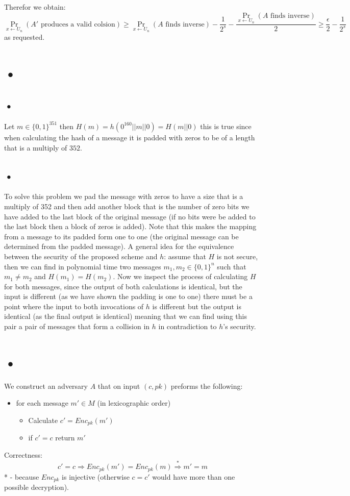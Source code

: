 \documentclass{article}
\begin{document}
Therefor we obtain:
\[\Pr_{x \leftarrow U_n}(A' \mbox{ produces a valid colsion}) \geq \Pr_{x \leftarrow U_n}(A \mbox{ finds inverse}) - \frac{1}{2^s} - \frac{\Pr_{x \leftarrow U_n}(A \mbox{ finds inverse})}{2} \geq \frac{\epsilon}{2} - \frac{1}{2^s}\]
as requested.

\section{•}
\subsection{•}
Let $m \in \{0,1\}^{351}$ then $H(m) = h(0^{160} || m || 0) = H(m||0)$ this is true since when calculating the hash of a message it is padded with zeros to be of a length that is a multiply of $352$.

\subsection{•}
To solve this problem we pad the message with zeros to have a size that is a multiply of 352 and then add another block that is the number of zero bits we have added to the last block of the original message (if no bits were be added to the last block then a block of zeros is added).
Note that this makes the mapping from a message to its padded form one to one (the original message can be determined from the padded message).
A general idea for the equivalence between the security of the proposed scheme and $h$:
assume that $H$ is not secure, then we can find in polynomial time two messages $m_1, m_2 \in \{0,1\}^n$ such that $m_1\neq m_2$ and $H(m_1) = H(m_2)$.
Now we inspect the process of calculating $H$ for both messages, since the output of both calculations is identical, but the input is different (as we have shown the padding is one to one) there must be a point where the input to both invocations of $h$ is different but the output is identical (as the final output is identical) meaning that we can find using this pair a pair of messages that form a collision in $h$ in contradiction to $h$'s security.

\section{•}
We construct an adversary $A$ that on input $(c, pk)$ preforms the following:
\begin{itemize}
\item for each message $m' \in M$ (in lexicographic order)
\begin{itemize}
\item Calculate $c'=Enc_{pk}(m')$
\item if $c'=c$ return $m'$
\end{itemize}
\end{itemize}
Correctness:
\[
c'=c \Rightarrow Enc_{pk}(m')=Enc_{pk}(m) \overset{*}{\Rightarrow} m'=m
\]
* - because $Enc_{pk}$ is injective (otherwise $c=c'$ would have more than one possible decryption).
\end{document}
